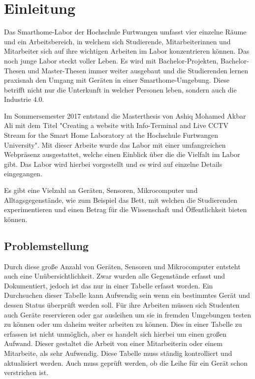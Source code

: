\chapter{Einleitung}
Das Smarthome-Labor der Hochschule Furtwangen umfasst vier einzelne Räume und ein Arbeitsbereich, in welchem sich Studierende, Mitarbeiterinnen und Mitarbeiter sich auf ihre wichtigen Arbeiten im Labor konzentrieren können. Das noch junge Labor steckt voller Leben. Es wird mit Bachelor-Projekten, Bachelor-Thesen und Master-Thesen immer weiter ausgebaut und die Studierenden lernen praxisnah den Umgang mit Geräten in einer Smarthome-Umgebung. Diese betrifft nicht nur die Unterkunft in welcher Personen leben, sondern auch die Industrie 4.0.

Im Sommersemester 2017 entstand die Masterthesis von Ashiq Mohamed Akbar Ali mit dem Titel "Creating a website with Info-Terminal and Live CCTV Stream for the Smart Home Laboratory at the Hochschule Furtwangen University". Mit dieser Arbeite wurde das Labor mit einer umfangreichen Webpräsenz ausgestattet, welche einen Einblick über die die Vielfalt im Labor gibt. Das Labor wird hierbei vorgestellt und es wird auf einzelne Details eingegangen. \autocite{akbarali}

Es gibt eine Vielzahl an Geräten, Sensoren, Mikrocomputer und Alltagsgegenstände, wie zum Beispiel das Bett, mit welchen die Studierenden experimentieren und einen Betrag für die Wissenschaft und Öffentlichkeit bieten können.




\section{Problemstellung}
\label{sec:Problemstellung}

Durch diese große Anzahl von Geräten, Sensoren und Mikrocomputer entsteht auch eine Unübersichtlichkeit. Zwar wurden alle Gegenstände erfasst und Dokumentiert, jedoch ist das nur in einer Tabelle erfasst worden. Ein Durchsuchen dieser Tabelle kann Aufwendig sein wenn ein bestimmtes Gerät und dessen Status überprüft werden soll. Für ihre Arbeiten müssen sich Studenten auch Geräte reservieren oder gar ausleihen um sie in fremden Umgebungen testen zu können oder um daheim weiter arbeiten zu können. Dies in einer Tabelle zu erfassen ist nicht unmöglich, aber es handelt sich hierbei um einen großen Aufwand. Dieser gestaltet die Arbeit von einer Mitarbeiterin oder einem Mitarbeite, als sehr Aufwendig. Diese Tabelle muss ständig kontrolliert und aktualisiert werden. Auch muss geprüft werden, ob die Leihe für ein Gerät schon verstrichen ist.


